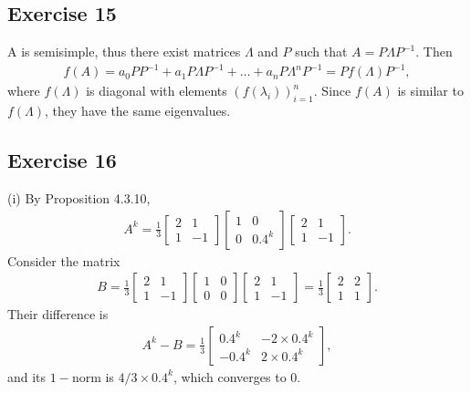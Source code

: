 \documentclass[11.5pt, letterpaper, bibtotoc,
    tablecaptionabove, figurecaptionabove]{article}
\begin{document}
\subsection*{Exercise 15}
A is semisimple, thus there exist matrices $\Lambda$ and $P$ such that
$A = P\Lambda P^{-1}$.
Then 
\begin{align*}
    f(A) = a_0PP^{-1}+a_1P\Lambda P^{-1}+
    \ldots+a_nP\Lambda^nP^{-1}=
    Pf(\Lambda)P^{-1},
\end{align*}
where $f(\Lambda)$ is diagonal with elements $(f(\lambda_i))_{i=1}^n$.
Since $f(A)$ is similar to $f(\Lambda)$, they have the same eigenvalues.

\subsection*{Exercise 16}
(i)
By Proposition 4.3.10,
\begin{align*}
    A^k = 
    \frac{1}{3}
    \begin{bmatrix}
        2 & 1\\ 1 & -1
    \end{bmatrix}
    \begin{bmatrix}
        1 & 0\\ 0 & 0.4^k
    \end{bmatrix}
    \begin{bmatrix}
        2 & 1\\ 1 & -1
    \end{bmatrix}.
\end{align*}
Consider the matrix 
\begin{align*} 
    B = 
    \frac{1}{3}
    \begin{bmatrix}
        2 & 1\\ 1 & -1
    \end{bmatrix}
    \begin{bmatrix}
        1 & 0\\ 0 & 0
    \end{bmatrix}
    \begin{bmatrix}
        2 & 1\\ 1 & -1
    \end{bmatrix} =
    \frac{1}{3}
    \begin{bmatrix}
        2 & 2\\ 1 & 1
    \end{bmatrix}.
\end{align*}
Their difference is
\begin{align*}
    A^k - B =
    \frac{1}{3}
    \begin{bmatrix}
        0.4^k & -2\times0.4^k\\ -0.4^k & 2\times0.4^k
    \end{bmatrix},
\end{align*}
and its $1-$norm is $4/3\times0.4^k$, which converges to 0.
\end{document}
